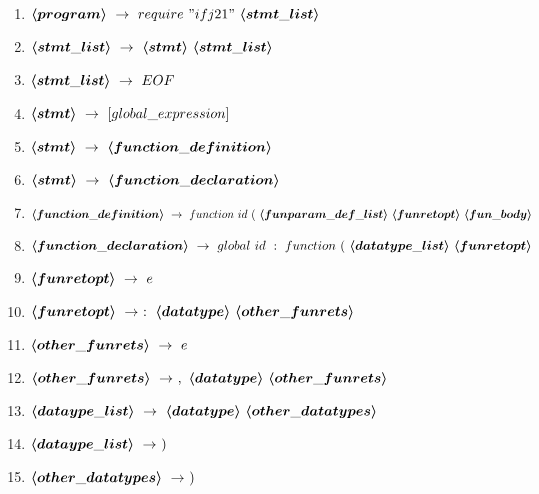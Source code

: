 \begin{enumerate}
	\item $\mbox{\boldmath$\langle{}program\rangle{}$}\ \rightarrow\ require\ "ifj21"\ \mbox{\boldmath$\langle{}stmt\_list\rangle{}$}$
	\item $\mbox{\boldmath$\langle{}stmt\_list\rangle{}$}\ \rightarrow\ \mbox{\boldmath$\langle{}stmt\rangle{}$}\ \mbox{\boldmath$\langle{}stmt\_list\rangle{}$}$
	\item $\mbox{\boldmath$\langle{}stmt\_list\rangle{}$}\ \rightarrow\ EOF$
	\item $\mbox{\boldmath$\langle{}stmt\rangle{}$}\ \rightarrow\ [global\_expression]$
	\item $\mbox{\boldmath$\langle{}stmt\rangle{}$}\ \rightarrow\ \mbox{\boldmath$\langle{}function\_definition\rangle{}$}$
	\item $\mbox{\boldmath$\langle{}stmt\rangle{}$}\ \rightarrow\ \mbox{\boldmath$\langle{}function\_declaration\rangle{}$}$
	\item $\mbox{\boldmath$\langle{}function\_definition\rangle{}$}\ \rightarrow\ function\ id\ (\ \mbox{\boldmath$\langle{}funparam\_def\_list\rangle{}$}\ \mbox{\boldmath$\langle{}funretopt\rangle{}$}\ \mbox{\boldmath$\langle{}fun\_body\rangle{}$}$
	\item $\mbox{\boldmath$\langle{}function\_declaration\rangle{}$}\ \rightarrow\ global\ id\ :\ function\ (\ \mbox{\boldmath$\langle{}datatype\_list\rangle{}$}\ \mbox{\boldmath$\langle{}funretopt\rangle{}$}$
	\item $\mbox{\boldmath$\langle{}funretopt\rangle{}$}\ \rightarrow\ e$
	\item $\mbox{\boldmath$\langle{}funretopt\rangle{}$}\ \rightarrow\ :\ \mbox{\boldmath$\langle{}datatype\rangle{}$}\ \mbox{\boldmath$\langle{}other\_funrets\rangle{}$}$
	\item $\mbox{\boldmath$\langle{}other\_funrets\rangle{}$}\ \rightarrow\ e$
	\item $\mbox{\boldmath$\langle{}other\_funrets\rangle{}$}\ \rightarrow\ ,\ \mbox{\boldmath$\langle{}datatype\rangle{}$}\ \mbox{\boldmath$\langle{}other\_funrets\rangle{}$}$
	\item $\mbox{\boldmath$\langle{}dataype\_list\rangle{}$}\ \rightarrow\ \mbox{\boldmath$\langle{}datatype\rangle{}$}\ \mbox{\boldmath$\langle{}other\_datatypes\rangle{}$}$
	\item $\mbox{\boldmath$\langle{}dataype\_list\rangle{}$}\ \rightarrow\ )$
	\item $\mbox{\boldmath$\langle{}other\_datatypes\rangle{}$}\ \rightarrow\ )$

\end{enumerate}

